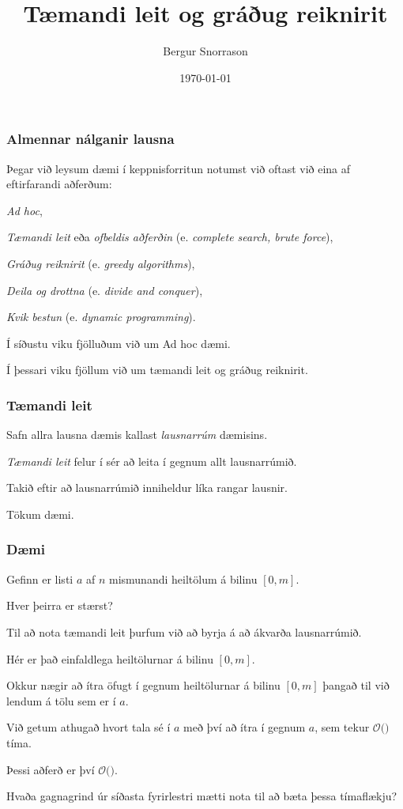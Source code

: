 \title{Tæmandi leit og gráðug reiknirit}
\author{Bergur Snorrason}
\date{\today}



\frame{\titlepage}

{
	\frametitle{Almennar nálganir lausna}
	{
		\item<1-> Þegar við leysum dæmi í keppnisforritun notumst við oftast við eina af eftirfarandi aðferðum:
		{
			\item<2-> \emph{Ad hoc},
			\item<3-> \emph{Tæmandi leit} eða \emph{ofbeldis aðferðin} (e. \emph{complete search, brute force}),
			\item<4-> \emph{Gráðug reiknirit} (e. \emph{greedy algorithms}),
			\item<5-> \emph{Deila og drottna} (e. \emph{divide and conquer}),
			\item<6-> \emph{Kvik bestun} (e. \emph{dynamic programming}).
		}
		\item<7-> Í síðustu viku fjölluðum við um Ad hoc dæmi.
		\item<8-> Í þessari viku fjöllum við um tæmandi leit og gráðug reiknirit.
	}
}

{
	\frametitle{Tæmandi leit}
	{
		\item<1-> Safn allra lausna dæmis kallast \emph{lausnarrúm} dæmisins.
		\item<2-> \emph{Tæmandi leit} felur í sér að leita í gegnum allt lausnarrúmið.
		\item<3-> Takið eftir að lausnarrúmið inniheldur líka rangar lausnir.
		\item<4-> Tökum dæmi.
	}
}

{
	\frametitle{Dæmi}
	{
		\item<1-> Gefinn er listi $a$ af $n$ mismunandi heiltölum á bilinu $[0, m]$.
		\item<2-> Hver þeirra er stærst?
		\item<3-> Til að nota tæmandi leit þurfum við að byrja á að ákvarða lausnarrúmið.
		\item<4-> Hér er það einfaldlega heiltölurnar á bilinu $[0, m]$.
		\item<5-> Okkur nægir að ítra öfugt í gegnum heiltölurnar á bilinu $[0, m]$ þangað til við lendum á tölu sem er í $a$.
		\item<6-> Við getum athugað hvort tala sé í $a$ með því að ítra í gegnum $a$, sem tekur $\mathcal{O}($$)$ tíma.
		\item<8-> Þessi aðferð er því $\mathcal{O}($\onslide<9->{$nm$}$)$.
		\item<10-> Hvaða gagnagrind úr síðasta fyrirlestri mætti nota til að bæta þessa tímaflækju?
	}
}

